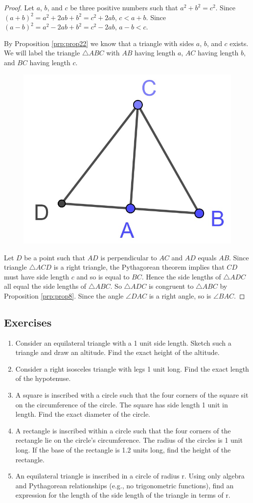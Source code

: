 \documentclass[
]{book}
\theoremstyle{definition}
\theoremstyle{definition}
\theoremstyle{definition}
\theoremstyle{definition}
\theoremstyle{remark}
\begin{document}
\begin{proof}
Let \(a\), \(b\), and \(c\) be three positive numbers such that \(a^2+b^2=c^2\). Since \((a+b)^2 = a^2+2ab+b^2 = c^2 + 2ab\), \(c<a+b\). Since \((a-b)^2 = a^2-2ab+b^2 = c^2-2ab\), \(a-b<c\).

By Proposition \ref{prp:prop22} we know that a triangle with sides \(a\), \(b\), and \(c\) exists. We will label the triangle \(\triangle ABC\) with \(AB\) having length \(a\), \(AC\) having length \(b\), and \(BC\) having length \(c\).

\begin{figure}

{\centering \includegraphics[width=0.2\linewidth]{images/pythagorean2} 

}

\end{figure}

Let \(D\) be a point such that \(AD\) is perpendicular to \(AC\) and \(AD\) equals \(AB\). Since triangle \(\triangle ACD\) is a right triangle, the Pythagorean theorem implies that \(CD\) must have side length \(c\) and so is equal to \(BC\). Hence the side lengths of \(\triangle ADC\) all equal the side lengths of \(\triangle ABC\). So \(\triangle ADC\) is congruent to \(\triangle ABC\) by Proposition \ref{prp:prop8}. Since the angle \(\angle DAC\) is a right angle, so is \(\angle BAC\).
\end{proof}

\hypertarget{exercises-45}{%
\subsection{Exercises}\label{exercises-45}}

\begin{enumerate}
\def\labelenumi{\arabic{enumi}.}
\item
  Consider an equilateral triangle with a 1 unit side length. Sketch such a triangle and draw an altitude. Find the exact height of the altitude.
\item
  Consider a right isosceles triangle with legs 1 unit long. Find the exact length of the hypotenuse.
\item
  A square is inscribed with a circle such that the four corners of the square sit on the circumference of the circle. The square has side length 1 unit in length. Find the exact diameter of the circle.
\item
  A rectangle is inscribed within a circle such that the four corners of the rectangle lie on the circle's circumference. The radius of the circles is 1 unit long. If the base of the rectangle is 1.2 units long, find the height of the rectangle.
\item
  An equilateral triangle is inscribed in a circle of radius r. Using only algebra and Pythagorean relationships (e.g., no trigonometric functions), find an expression for the length of the side length of the triangle in terms of r.
\end{enumerate}
\end{document}
